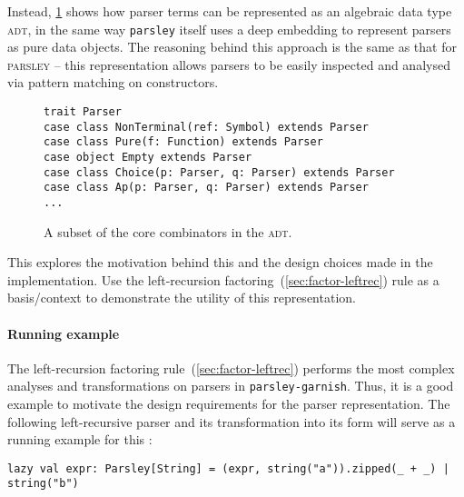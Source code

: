 \documentclass[../../../main.tex]{subfiles}
\begin{document}
Instead, \cref{fig:parser-adt} shows how parser terms can be represented as an algebraic data type \textsc{adt}, in the same way \texttt{parsley} itself uses a deep embedding to represent parsers as pure data objects.
The reasoning behind this approach is the same as that for \textsc{parsley} -- this representation allows parsers to be easily inspected and analysed via pattern matching on constructors.

\begin{figure}[htbp]
\begin{verbatim}
trait Parser
case class NonTerminal(ref: Symbol) extends Parser
case class Pure(f: Function) extends Parser
case object Empty extends Parser
case class Choice(p: Parser, q: Parser) extends Parser
case class Ap(p: Parser, q: Parser) extends Parser
...
\end{verbatim}
\caption{A subset of the core combinators in the  \textsc{adt}.}
\label{fig:parser-adt}
\end{figure}


This  explores the motivation behind this and the design choices made in the implementation.
Use the left-recursion factoring~(\cref{sec:factor-leftrec}) rule as a basis/context to demonstrate the utility of this representation.


\paragraph{Running example}
The left-recursion factoring rule~(\cref{sec:factor-leftrec}) performs the most complex analyses and transformations on parsers in \texttt{parsley-garnish}.
Thus, it is a good example to motivate the design requirements for the parser representation.
The following left-recursive parser and its transformation into its  form will serve as a running example for this :
\begin{verbatim}
lazy val expr: Parsley[String] = (expr, string("a")).zipped(_ + _) | string("b")
\end{verbatim}
\end{document}
